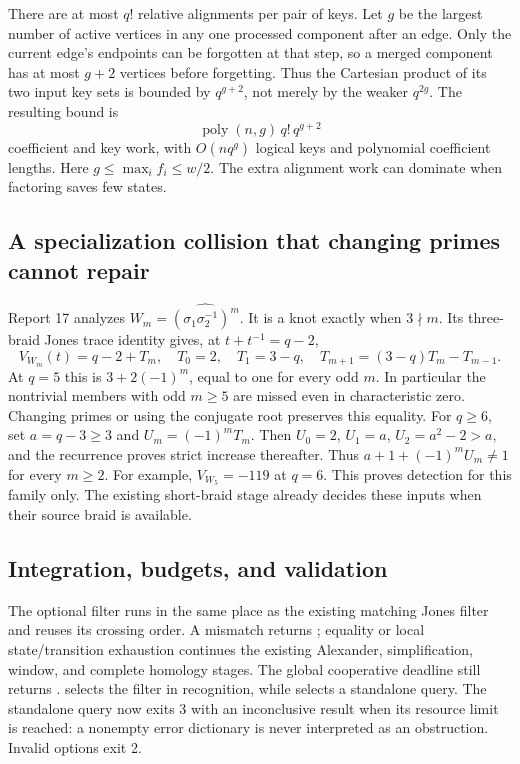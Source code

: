 There are at most $q!$ relative alignments per pair of keys. Let $g$ be the
largest number of active vertices in any one processed component after an
edge. Only the current edge's endpoints can be forgotten at that step,
so a merged component has at most $g+2$ vertices before forgetting. Thus
the Cartesian product of its two input key sets is bounded by $q^{g+2}$,
not merely by the weaker $q^{2g}$. The resulting bound is
\[
 \operatorname{poly}(n,g)\,q!\,q^{g+2}
\]
coefficient and key work, with $O(nq^g)$ logical keys and polynomial
coefficient lengths. Here $g\le\max_i f_i\le w/2$.
The extra alignment work can dominate when factoring saves few states.

\subsection{A specialization collision that changing primes cannot repair}
Report 17 analyzes $W_m=\widehat{(\sigma_1\sigma_2^{-1})^m}$.
It is a knot exactly when $3\nmid m$. Its three-braid Jones trace identity
gives, at $t+t^{-1}=q-2$,
\[
 V_{W_m}(t)=q-2+T_m,\quad
 T_0=2,\quad T_1=3-q,\quad T_{m+1}=(3-q)T_m-T_{m-1}.
\]
At $q=5$ this is $3+2(-1)^m$, equal to one for every odd $m$.
In particular the nontrivial members with odd $m\ge5$ are missed even in
characteristic zero. Changing primes or using the conjugate root preserves
this equality. For $q\ge6$, set $a=q-3\ge3$ and
$U_m=(-1)^mT_m$. Then $U_0=2$, $U_1=a$,
$U_2=a^2-2>a$, and the recurrence proves strict increase thereafter.
Thus $a+1+(-1)^mU_m\ne1$ for every $m\ge2$.
For example, $V_{W_5}=-119$ at $q=6$.
This proves detection for this family only. The existing short-braid stage
already decides these inputs when their source braid is available.

\subsection{Integration, budgets, and validation}
The optional filter runs in the same place as the existing matching Jones
filter and reuses its crossing order. A mismatch returns ;
equality or local state/transition exhaustion continues the existing
Alexander, simplification, window, and complete homology stages.
The global cooperative deadline still returns .
 selects the filter in recognition, while
 selects a standalone query.
The standalone query now exits 3 with an inconclusive result when its
resource limit is reached: a nonempty error dictionary is never interpreted
as an obstruction. Invalid options exit 2.

